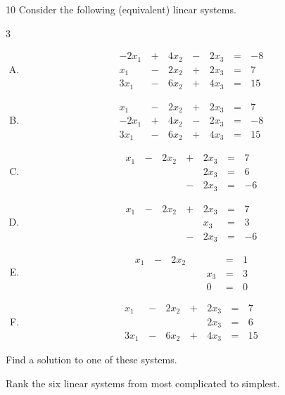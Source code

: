 \begin{activity}{10}
  Consider the following (equivalent) linear systems.
  \begin{multicols}{3}%
  \begin{enumerate}[(A)]
    \item \[
		\begin{alignedat}{4}
   		  -2x_1 &\,+\,& 4x_2 &\,-\,& 2x_3 &\,=\,& -8 \\
   		  x_1 &\,-\,& 2x_2 &\,+\,& 2x_3 &\,=\,& 7 \\
   		  3x_1 &\,-\, & 6x_2 &\,+\,&  4x_3 &\,=\,&  15
   		\end{alignedat}
	\]

    \item \[
		\begin{alignedat}{4}
   		  x_1 &\,-\,& 2x_2 &\,+\,& 2x_3 &\,=\,& 7 \\
   		  -2x_1 &\,+\,& 4x_2 &\,-\,& 2x_3 &\,=\,& -8 \\
   		  3x_1 &\,-\, & 6x_2 &\,+\,&  4x_3 &\,=\,&  15
   		\end{alignedat}
	\]

    \item \[
		\begin{alignedat}{4}
   		  x_1 &\,-\,& 2x_2 &\,+\,& 2x_3 &\,=\,& 7 \\
   		   & &  & & 2x_3 &\,=\,& 6 \\
   		   & & &\,-\,&2x_3 &\,=\,& -6
   		\end{alignedat}
	\]

    \item \[
		\begin{alignedat}{4}
   		  x_1 &\,-\,& 2x_2 &\,+\,& 2x_3 &\,=\,& 7 \\
   		   & &  & & x_3 &\,=\,& 3 \\
   		   & & &\,-\,&2x_3 &\,=\,& -6
   		\end{alignedat}
	\]

    \item \[
		\begin{alignedat}{4}
   		  x_1 &\,-\,& 2x_2 &&  &\,=\,& 1 \\
   		   & &  &\,\,\, & x_3 &\,=\,& 3 \\
   		   & & &&0 &\,=\,& 0
   		\end{alignedat}
	\]

    \item \[
		\begin{alignedat}{4}
   		  x_1 &\,-\,& 2x_2 &\,+\,& 2x_3 &\,=\,& 7 \\
   		   &\,&  && 2x_3 &\,=\,& 6 \\
   		  3x_1 &\,-\, & 6x_2 &\,+\,&  4x_3 &\,=\,&  15
   		\end{alignedat}
	\]
	\end{enumerate}
    \end{multicols}
  \begin{subactivity}
  	Find a solution to one of these systems.
	\end{subactivity}
  \begin{subactivity}
    Rank the six linear systems from most complicated to simplest.
  \end{subactivity}
\end{activity}


